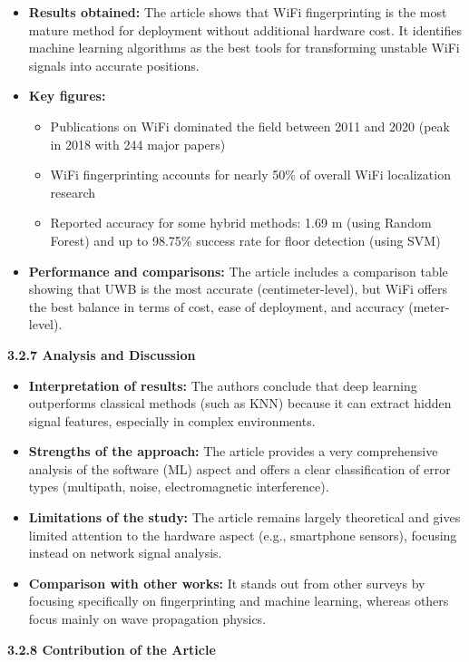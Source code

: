 \documentclass{ipgpmaster}
\begin{document}
\begin{itemize}
    \item \textbf{Results obtained:}
 The article shows that WiFi fingerprinting is the most mature method for deployment without additional hardware cost. It identifies machine learning algorithms as the best tools for transforming unstable WiFi signals into accurate positions. 

    \item \textbf{Key figures:} 
    \begin{itemize}
        \item Publications on WiFi dominated the field between 2011 and 2020 (peak in 2018 with 244 major papers) 
        \item WiFi fingerprinting accounts for nearly 50\% of overall WiFi localization research 
        \item Reported accuracy for some hybrid methods: 1.69 m (using Random Forest) and up to 98.75\% success rate for floor detection (using SVM) 



    \end{itemize}
    \item \textbf{Performance and comparisons:}
 The article includes a comparison table showing that UWB is the most accurate (centimeter-level), but WiFi offers the best balance in terms of cost, ease of deployment, and accuracy (meter-level). 


\end{itemize}
 \textbf{3.2.7 Analysis and Discussion}

\begin{itemize}
    \item \textbf{Interpretation of results:}
 The authors conclude that deep learning outperforms classical methods (such as KNN) because it can extract hidden signal features, especially in complex environments. 

    \item \textbf{Strengths of the approach:}
 The article provides a very comprehensive analysis of the software (ML) aspect and offers a clear classification of error types (multipath, noise, electromagnetic interference). 

    \item \textbf{Limitations of the study:}
 The article remains largely theoretical and gives limited attention to the hardware aspect (e.g., smartphone sensors), focusing instead on network signal analysis. 

    \item \textbf{Comparison with other works:}
 It stands out from other surveys by focusing specifically on fingerprinting and machine learning, whereas others focus mainly on wave propagation physics. 





\end{itemize}
 \textbf{3.2.8    Contribution of the Article}
 
\end{document}
